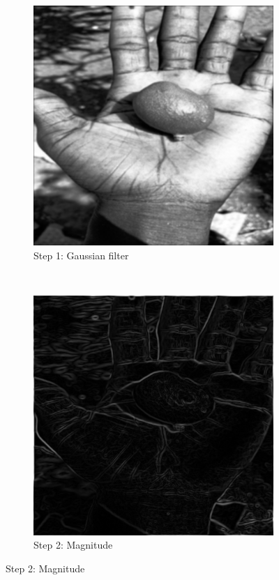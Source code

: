 \documentclass{article}
\begin{document}
\begin{enumerate}[label=(\alph*)]
\begin{figure}[!htb]
\begin{subfigure}[b]{0.3\textwidth}
            \includegraphics[width=\textwidth]{img/GF.png}
            \caption{Step 1: Gaussian filter}
        \end{subfigure}
        ~
        \begin{subfigure}[b]{0.3\textwidth}
            \includegraphics[width=\textwidth]{img/G.png}
            \caption{Step 2: Magnitude}
        \end{subfigure}
        

\end{figure}
\end{enumerate}
\end{document}
